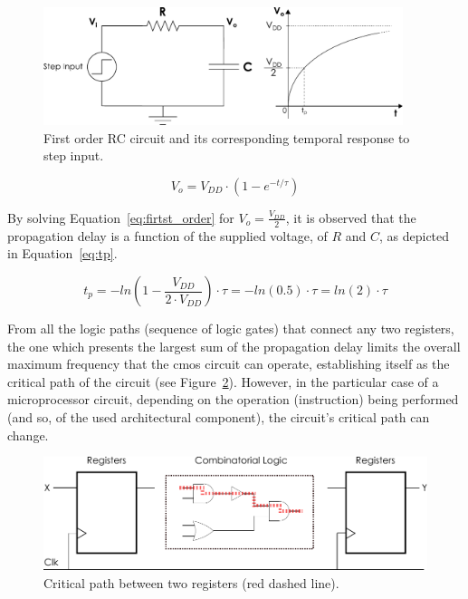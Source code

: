\begin{figure}[htb]
    \centering
    \includegraphics[width=105mm]{Figures/Background/rc_circuit.pdf}
    \caption{First order RC circuit and its corresponding temporal response to step input.}
    \label{fig:rc_circuit}
\end{figure}

\begin{equation}
    V_o=V_{DD} \cdot (1-e^{-t/\tau})
    \label{eq:firtst_order}
\end{equation}

By solving Equation~\ref{eq:firtst_order} for $V_o=\frac{V_{DD}}{2}$, it is observed that the propagation delay is a function of the supplied voltage, of $R$ and $C$, as depicted in Equation~\ref{eq:tp}.


\begin{equation}
    t_p=-ln\left(1-\frac{V_{DD}}{2 \cdot V_{DD}}\right)\cdot\tau=-ln(0.5)\cdot\tau=ln(2)\cdot\tau
    \label{eq:tp}
\end{equation}


From all the logic paths (sequence of logic gates) that connect any two registers, the one which presents the largest sum of the propagation delay limits the overall maximum frequency that the \acrshort{cmos} circuit can operate, establishing itself as the critical path of the circuit (see Figure~\ref{fig:critical_path}). However, in the particular case of a microprocessor circuit, depending on the operation (instruction) being performed (and so, of the used architectural component), the circuit's critical path can change.

\begin{figure}[htb]
    \centering
    \includegraphics[width=130mm]{Figures/Background/comb_logic.pdf}
    \caption{Critical path between two registers (red dashed line).}
    \label{fig:critical_path}
\end{figure}

